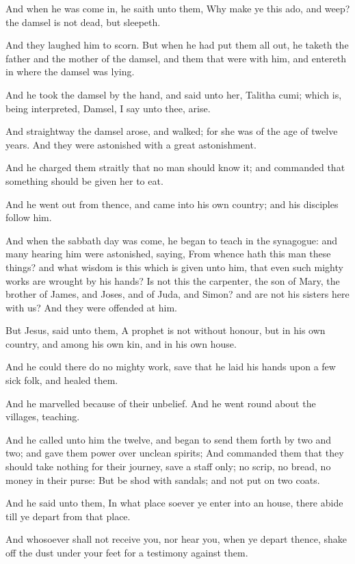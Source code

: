 \Verse And when he was come in, he saith unto them, Why make ye this ado, and weep? the damsel is not dead, but sleepeth.

\Verse And they laughed him to scorn. But when he had put them all out, he taketh the father and the mother of the damsel, and them that were with him, and entereth in where the damsel was lying.

\Verse And he took the damsel by the hand, and said unto her, Talitha cumi; which is, being interpreted, Damsel, I say unto thee, arise.

\Verse And straightway the damsel arose, and walked; for she was of the age of twelve years. And they were astonished with a great astonishment.

\Verse And he charged them straitly that no man should know it; and commanded that something should be given her to eat.


\Chapter
\Verse And he went out from thence, and came into his own country; and his disciples follow him.

\Verse And when the sabbath day was come, he began to teach in the synagogue: and many hearing him were astonished, saying, From whence hath this man these things? and what wisdom is this which is given unto him, that even such mighty works are wrought by his hands?  \Verse Is not this the carpenter, the son of Mary, the brother of James, and Joses, and of Juda, and Simon? and are not his sisters here with us?  And they were offended at him.

\Verse But Jesus, said unto them, A prophet is not without honour, but in his own country, and among his own kin, and in his own house.

\Verse And he could there do no mighty work, save that he laid his hands upon a few sick folk, and healed them.

\Verse And he marvelled because of their unbelief. And he went round about the villages, teaching.

\Verse And he called unto him the twelve, and began to send them forth by two and two; and gave them power over unclean spirits; \Verse And commanded them that they should take nothing for their journey, save a staff only; no scrip, no bread, no money in their purse: \Verse But be shod with sandals; and not put on two coats.

\Verse And he said unto them, In what place soever ye enter into an house, there abide till ye depart from that place.

\Verse And whosoever shall not receive you, nor hear you, when ye depart thence, shake off the dust under your feet for a testimony against them.

